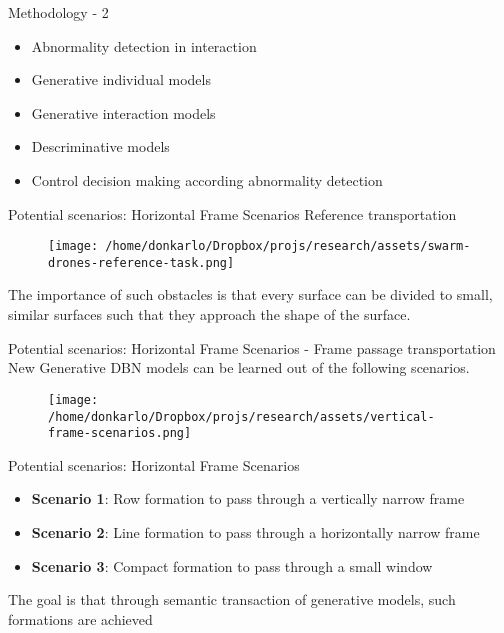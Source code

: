 \documentclass[unknownkeysallowed]{beamer}
\begin{document}
	\begin{frame}{Methodology - 2}
		\begin{itemize}
			\item Abnormality detection in interaction
			\item Generative individual models
			\item Generative interaction models
			\item Descriminative models
			\item Control decision making according abnormality detection
		\end{itemize}
	\end{frame}

	\begin{frame}{Potential scenarios: Horizontal Frame Scenarios}
		Reference transportation
		\begin{figure}
			\centering
			\texttt{[image: /home/donkarlo/Dropbox/projs/research/assets/swarm-drones-reference-task.png]}
			\label{fig:swarm-drones-reference-task}
		\end{figure}
		The importance of such obstacles is that every surface can be divided to small, similar surfaces such that they approach the shape of the surface. 
	\end{frame}

	\begin{frame}{Potential scenarios: Horizontal Frame Scenarios - Frame passage transportation}
		New Generative DBN models can be learned out of the following scenarios. 
		\begin{figure}
			\centering
			\texttt{[image: /home/donkarlo/Dropbox/projs/research/assets/vertical-frame-scenarios.png]}
			\label{fig:collective-behaviour-learning}
		\end{figure}
	\end{frame}

	\begin{frame}{Potential scenarios: Horizontal Frame Scenarios}
		\begin{itemize}
			\item \textbf{Scenario 1}: Row formation to pass through a vertically narrow frame 
			\item \textbf{Scenario 2}: Line formation to pass through a horizontally narrow frame
			\item \textbf{Scenario 3}: Compact formation to pass through a small window
		\end{itemize}
		The goal is that through semantic transaction of generative models, such formations are achieved
	\end{frame}
\end{document}
